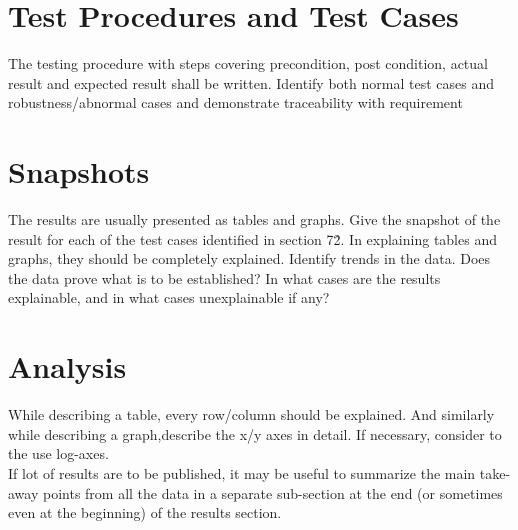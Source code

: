 \section{Test Procedures and Test Cases}
The testing procedure with steps covering precondition, post condition, actual result and expected result shall be written. Identify both normal test cases and robustness/abnormal cases and demonstrate traceability with requirement\\

\section{Snapshots}
The results are usually presented as tables and graphs. Give the snapshot of the result for each of the test cases identified in section 7\.2. In explaining tables and graphs, they should be completely explained. Identify trends in the data. Does the data prove what is to be established? In what cases are the results explainable, and in what cases unexplainable if any? \\

\section{Analysis}
While describing a table, every row/column should be explained. And similarly while describing a graph,describe the x/y axes in detail. If necessary, consider to  the use  log-axes. \\
If lot of results are to be published, it may be useful to summarize the main take-away points from all the data in a separate sub-section at the end (or sometimes even at the beginning) of the results section. \\

